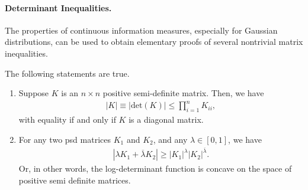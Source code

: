            \paragraph{Determinant Inequalities.} The properties of continuous information measures, especially for Gaussian distributions, can be used to obtain elementary proofs of several nontrivial matrix inequalities. 
            \begin{proposition}
                The following statements are true. 
                \begin{enumerate}[label=(\alph*)]
                    \item  Suppose $K$ is an $n \times n$ positive semi-definite matrix. Then, we have 
                    \begin{align}
                        |K| \equiv |\text{det}(K)| \leq \prod_{i=1}^n K_{ii}, 
                    \end{align}
                    with equality if and only if $K$ is a diagonal matrix. 
                    \item  For any two psd matrices $K_1$ and $K_2$, and any $\lambda \in [0, 1]$, we have 
                    \begin{align}
                        |\lambda K_1 + \overline{\lambda} K_2| \geq |K_1|^{\lambda} |K_2|^{\overline{\lambda}}.   
                    \end{align}
                    Or, in other words, the log-determinant function is concave on the space of positive semi definite matrices. 
                \end{enumerate}
            \end{proposition}
